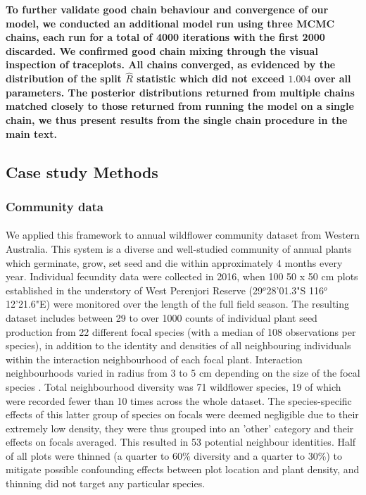 \begin{refsection}
    \textbf{To further validate good chain behaviour and convergence of our model, we conducted an additional model run using three MCMC chains, each run for a total of 4000 iterations with the first 2000 discarded. We confirmed good chain mixing through the visual inspection of traceplots. All chains converged, as evidenced by the distribution of the split $\hat{R}$ statistic  which did not exceed $1.004$ over all parameters. The posterior distributions returned from multiple chains matched closely to those returned from running the model on a single chain, we thus present results from the single chain procedure in the main text. 
    }

    \subsection{Case study Methods}
    \label{SI:casestudy}

        \subsubsection{Community data}

        \paragraph{}
        We applied this framework to annual wildflower community dataset from Western Australia. This system is a diverse and well-studied community of annual plants which germinate, grow, set seed and die within approximately 4 months every year. Individual fecundity data were collected in 2016, when 100 50 x 50 cm plots established in the understory of West Perenjori Reserve (29$^o$28'01.3"S 116$^o$12'21.6"E) were monitored over the length of the full field season. The resulting dataset includes between 29 to over 1000 counts of individual plant seed production from 22 different focal species (with a median of 108 observations per species), in addition to the identity and densities of all neighbouring individuals within the interaction neighbourhood of each focal plant. Interaction neighbourhoods varied in radius from 3 to 5 cm depending on the size of the focal species \parencite{Martyn2020}. Total neighbourhood diversity was 71 wildflower species, 19 of which were recorded fewer than 10 times across the whole dataset. The species-specific effects of this latter group of species on focals were deemed negligible due to their extremely low density, they were thus grouped into an 'other' category and their effects on focals averaged. This resulted in 53 potential neighbour identities. Half of all plots were thinned (a quarter to 60\% diversity and a quarter to 30\%) to mitigate possible confounding effects between plot location and plant density, and thinning did not target any particular species. 


\end{refsection}
